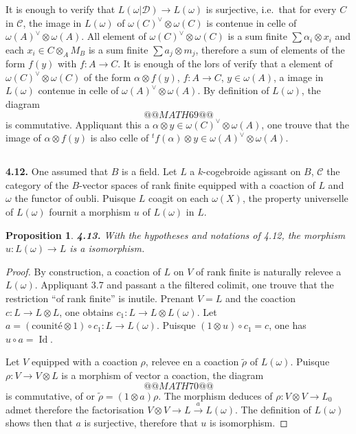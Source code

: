 \documentclass[12pt,a4paper]{article}
\theoremstyle{plain}
\newtheorem{proposition}[theorem]{Proposition}
\theoremstyle{definition}
\theoremstyle{remark}
\DeclareMathOperator{\Id}{Id}
\begin{document}
It is enough to verify that $L(\omega|\mathcal{D}) \to L(\omega)$ is surjective, i.e.~that for every $C$ in $\mathcal{C}$, the image in $L(\omega)$ of $\omega(C)^\vee \otimes \omega(C)$ is contenue in celle of $\omega(A)^\vee \otimes \omega(A)$. All element of $\omega(C)^\vee \otimes \omega(C)$ is a sum finite $\sum \alpha_i \otimes x_i$ and each $x_i \in C \otimes_A M_B$ is a sum finite $\sum a_j \otimes m_j$, therefore a sum of elements of the form $f(y)$ with $f : A \to C$. It is enough of the lors of verify that a element of $\omega(C)^\vee \otimes \omega(C)$ of the form $\alpha \otimes f(y)$, $f : A \to C$, $y \in \omega(A)$, a image in $L(\omega)$ contenue in celle of $\omega(A)^\vee \otimes \omega(A)$. By definition of $L(\omega)$, the diagram
\[
@@MATH69@@
\]
is commutative. Appliquant this a $\alpha \otimes y \in \omega(C)^\vee \otimes \omega(A)$, one trouve that the image of $\alpha \otimes f(y)$ is also celle of ${}^t f(\alpha) \otimes y \in \omega(A)^\vee \otimes \omega(A)$.

\subsection{}

\textbf{4.12.} One assumed that $B$ is a field. Let $L$ a $k$-cogebroide agissant on $B$, $\mathcal{C}$ the category of the $B$-vector spaces of rank finite equipped with a coaction of $L$ and $\omega$ the functor of oubli. Puisque $L$ coagit on each $\omega(X)$, the property universelle of $L(\omega)$ fournit a morphism $u$ of $L(\omega)$ in $L$.

\begin{proposition}\label{prop:4.13}
\textbf{4.13.} With the hypotheses and notations of 4.12, the morphism $u : L(\omega) \to L$ is a isomorphism.
\end{proposition}

\begin{proof}
By construction, a coaction of $L$ on $V$ of rank finite is naturally relevee a $L(\omega)$. Appliquant 3.7 and passant a the filtered colimit, one trouve that the restriction ``of rank finite'' is inutile. Prenant $V = L$ and the coaction $c : L \to L \otimes L$, one obtains $c_1 : L \to L \otimes L(\omega)$. Let $a = (\text{counité} \otimes 1) \circ c_1 : L \to L(\omega)$. Puisque $(1 \otimes u) \circ c_1 = c$, one has $u \circ a = \Id$.

Let $V$ equipped with a coaction $\rho$, relevee en a coaction $\tilde{\rho}$ of $L(\omega)$. Puisque $\rho : V \to V \otimes L$ is a morphism of vector a coaction, the diagram
\[
@@MATH70@@
\]
is commutative, of or $\tilde{\rho} = (1 \otimes a)\rho$. The morphism deduces of $\rho : V \otimes V \to L_0$ admet therefore the factorisation $V \otimes V \to L \xrightarrow{a} L(\omega)$. The definition of $L(\omega)$ shows then that $a$ is surjective, therefore that $u$ is isomorphism.
\end{proof}
\end{document}

